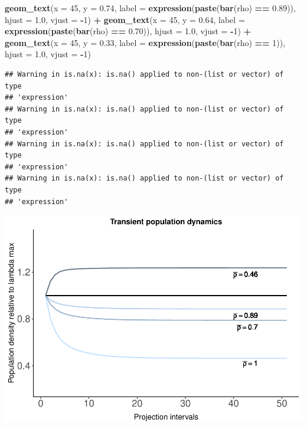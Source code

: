 \documentclass[
]{book}
\newenvironment{Shaded}{\begin{snugshade}}{\end{snugshade}}
\newcommand{\AttributeTok}[1]{\textcolor[rgb]{0.13,0.29,0.53}{#1}}
\newcommand{\DecValTok}[1]{\textcolor[rgb]{0.00,0.00,0.81}{#1}}
\newcommand{\FloatTok}[1]{\textcolor[rgb]{0.00,0.00,0.81}{#1}}
\newcommand{\FunctionTok}[1]{\textcolor[rgb]{0.13,0.29,0.53}{\textbf{#1}}}
\newcommand{\NormalTok}[1]{#1}
\newcommand{\SpecialCharTok}[1]{\textcolor[rgb]{0.81,0.36,0.00}{\textbf{#1}}}
\theoremstyle{definition}
\theoremstyle{definition}
\theoremstyle{definition}
\theoremstyle{definition}
\theoremstyle{remark}
\begin{document}
\begin{Shaded}
\begin{Highlighting}[]
\FunctionTok{geom\_text}\NormalTok{(}\AttributeTok{x =} \DecValTok{45}\NormalTok{, }\AttributeTok{y =} \FloatTok{0.74}\NormalTok{, }\AttributeTok{label =} \FunctionTok{expression}\NormalTok{(}\FunctionTok{paste}\NormalTok{(}\FunctionTok{bar}\NormalTok{(rho) }\SpecialCharTok{==} \FloatTok{0.89}\NormalTok{)), }\AttributeTok{hjust =} \FloatTok{1.0}\NormalTok{, }\AttributeTok{vjust =} \SpecialCharTok{{-}}\DecValTok{1}\NormalTok{) }\SpecialCharTok{+}
\FunctionTok{geom\_text}\NormalTok{(}\AttributeTok{x =} \DecValTok{45}\NormalTok{, }\AttributeTok{y =} \FloatTok{0.64}\NormalTok{, }\AttributeTok{label =}  \FunctionTok{expression}\NormalTok{(}\FunctionTok{paste}\NormalTok{(}\FunctionTok{bar}\NormalTok{(rho) }\SpecialCharTok{==} \FloatTok{0.70}\NormalTok{)), }\AttributeTok{hjust =} \FloatTok{1.0}\NormalTok{, }\AttributeTok{vjust =} \SpecialCharTok{{-}}\DecValTok{1}\NormalTok{) }\SpecialCharTok{+}
\FunctionTok{geom\_text}\NormalTok{(}\AttributeTok{x =} \DecValTok{45}\NormalTok{, }\AttributeTok{y =} \FloatTok{0.33}\NormalTok{, }\AttributeTok{label =}  \FunctionTok{expression}\NormalTok{(}\FunctionTok{paste}\NormalTok{(}\FunctionTok{bar}\NormalTok{(rho) }\SpecialCharTok{==} \DecValTok{1}\NormalTok{)), }\AttributeTok{hjust =} \FloatTok{1.0}\NormalTok{, }\AttributeTok{vjust =} \SpecialCharTok{{-}}\DecValTok{1}\NormalTok{)}
\end{Highlighting}
\end{Shaded}

\begin{verbatim}
## Warning in is.na(x): is.na() applied to non-(list or vector) of type
## 'expression'
## Warning in is.na(x): is.na() applied to non-(list or vector) of type
## 'expression'
## Warning in is.na(x): is.na() applied to non-(list or vector) of type
## 'expression'
## Warning in is.na(x): is.na() applied to non-(list or vector) of type
## 'expression'
\end{verbatim}

\includegraphics{Diagnostico_Poblacional_files/figure-latex/chap10_5-6.pdf}
\end{document}
